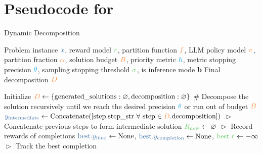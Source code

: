 \section{Pseudocode for \decomp}
\begin{algorithm}[h!]
\caption{Dynamic Decomposition}
\label{alg:dynamic_decomposition}
\begin{algorithmic}[1]
     Problem instance $\textcolor{algcolor3}{x}$, reward model $\textcolor{algcolor4}{r}$, 
    partition function $\textcolor{algcolor6}{f}$, LLM policy model $\textcolor{algcolor6}{\pi}$,  
    partition fraction $\textcolor{algcolor6}{\alpha}$, solution budget $\textcolor{algcolor6}{B}$, priority metric $\textcolor{algcolor5}{h}$, 
    metric stopping precision $\textcolor{algcolor5}{\theta}$, sampling stopping threshold $\textcolor{algcolor4}{\sigma}$, 
    is inference mode \textbf{b}\textsubscript{}
     Final decomposition $\textcolor{algcolor6}{D}$

    \STATE Initialize $\textcolor{algcolor6}{D} \gets \{\text{generated\_solutions}: \varnothing, \text{decomposition}: \varnothing\}$
    \STATE \textcolor{algcolor1}{\# Decompose the solution recursively until we reach the desired precision $\textcolor{algcolor5}{\theta}$ or run out of budget $\textcolor{algcolor6}{B}$}
        \STATE $\textcolor{algcolor3}{y_{\text{intermediate}}} \gets \text{Concatenate}([ \text{step.step\_str} \ \forall \ \text{step} \in \textcolor{algcolor6}{D}.\text{decomposition} ])$ 
        \STATE \hspace*{\fill} \textcolor{algcolor2}{$\vartriangleright$ Concatenate previous steps to form intermediate solution}
        \STATE $\textcolor{algcolor4}{R_{\text{new}}} \gets \varnothing$ \hspace*{\fill} \textcolor{algcolor2}{$\vartriangleright$ Record rewards of completions}
        \STATE $\textcolor{algcolor3}{\text{best}.y_{\text{final}}} \gets \text{None}$, $\textcolor{algcolor3}{\text{best}.y_{\text{completion}}} \gets \text{None}$,  $\textcolor{algcolor4}{\text{best}.r} \gets -\infty$ 
        \hspace*{\fill} \textcolor{algcolor2}{\hspace*{\fill} $\vartriangleright$ Track the best completion}


\end{algorithmic}
\end{algorithm}
